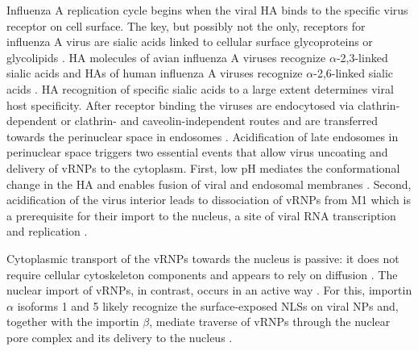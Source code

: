 	Influenza A replication cycle begins when the viral \gls{HA} binds to the specific virus receptor on cell surface. The key, but possibly not the only, receptors for influenza A virus are sialic acids linked to cellular surface glycoproteins or glycolipids \parencite{Skehel2000, Stray2000, Martin1998}. \gls{HA} molecules of avian influenza A viruses recognize $\alpha$-2,3-linked sialic acids and \glspl{HA} of human influenza A viruses recognize $\alpha$-2,6-linked sialic acids \parencite{Connor1994, VanRiel2010}. \gls{HA} recognition of specific sialic acids to a large extent determines viral host specificity. After receptor binding the viruses are endocytosed via clathrin-dependent or clathrin- and caveolin-independent routes and are transferred towards the perinuclear space in endosomes \parencite{Dourmashkin1974, Matlin1981, Sieczkarski2002, Lakadamyali2003}. Acidification of late endosomes in perinuclear space triggers two essential events that allow virus uncoating and delivery of \gls{vRNP}s to the cytoplasm. First, low pH mediates the conformational change in the \gls{HA} and enables fusion of viral and endosomal membranes \parencite{Carr1993}. Second, acidification of the virus interior leads to dissociation of \glspl{vRNP} from \gls{M1} which is a prerequisite for their import to the nucleus, a site of viral RNA transcription and replication \parencite{Bui1996, Stauffer2014}. 
	
	Cytoplasmic transport of the \glspl{vRNP} towards the nucleus is passive: it does not require cellular cytoskeleton components and appears to rely on diffusion \parencite{Martin1991, Babcock2004}. 
	The nuclear import of \glspl{vRNP}, in contrast, occurs in an active way \parencite {Kemler1994}. For this, importin $\alpha$ isoforms 1 and 5 likely recognize the surface-exposed \glspl{NLS} on viral \glspl{NP} and, together with the importin $\beta$, mediate traverse of \glspl{vRNP} through the nuclear pore complex and its delivery to the nucleus \parencite{Martin1991, ONeill1995, Chou2013, Cros2005, Moeller2012}. 
	
